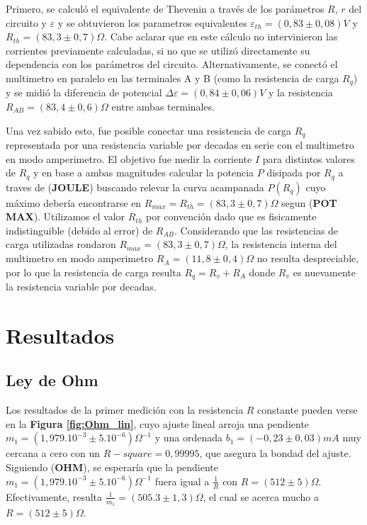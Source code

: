 \documentclass[11pt,a4paper]{article}
\begin{document}
Primero, se calculó el equivalente de Thevenin a través de los parámetros $R$, $r$ del circuito y $\varepsilon$ y se obtuvieron los parametros equivalentes $\varepsilon_{th} = (0,83\pm0,08)V$ y $R_{th} = (83,3 \pm 0,7) \Omega$. Cabe aclarar que en este cálculo no intervinieron las corrientes previamente calculadas, si no que se utilizó directamente su dependencia con los parámetros del circuito. Alternativamente, se conectó el multimetro en paralelo en las terminales A y B (como la resistencia de carga $R_q$) y se midió la diferencia de potencial $\Delta\varepsilon = (0,84 \pm 0,06)V$ y la resistencia $R_{AB} = (83,4\pm0,6)\Omega$ entre ambas terminales. 

Una vez sabido esto, fue posible conectar una resistencia de carga $R_q$ representada por una resistencia variable por decadas en serie con el multimetro en modo amperimetro. El objetivo fue medir la corriente $I$ para distintos valores de $R_q$ y en base a ambas magnitudes calcular la potencia $P$ disipada por $R_q$ a traves de (\textbf{JOULE}) buscando relevar la curva acampanada $P(R_q)$ cuyo máximo debería encontrarse en $R_{max} = R_{th} = (83,3\pm0,7)\Omega$ segun (\textbf{POT MAX}). Utilizamos el valor $R_{th}$ por convención dado que es fisicamente indistinguible (debido al error) de $R_{AB}$. Considerando que las resistencias de carga utilizadas rondaron $R_{max} = (83,3\pm0,7)\Omega$, la resistencia interna del multimetro en modo amperimetro $R_{A} = (11,8 \pm 0,4) \Omega$ no resulta despreciable, por lo que la resistencia de carga resulta $R_q = R_v + R_A$ donde $R_v$ es nuevamente la resistencia variable por decadas. 


\section{Resultados}
\label{sec:discusion}

\subsection{Ley de Ohm}

Los resultados de la primer medición con la resistencia $R$ constante pueden verse en la \textbf{Figura \ref{fig:Ohm_lin}}, cuyo ajuste lineal arroja una pendiente $m_1 = (1,979.10^{-3} \pm 5.10^{-6})\Omega^{-1}$ y una ordenada $b_1 = (-0,23\pm 0,03)mA$ muy cercana a cero con un $R-square = 0,99995$, que asegura la bondad del ajuste. Siguiendo (\textbf{OHM}), se esperaría que la pendiente $m_1 = (1,979.10^{-3} \pm 5.10^{-6})\Omega^{-1}$ fuera igual a $\frac{1}{R}$ con $R = (512 \pm 5)\Omega$. Efectivamente, resulta $\frac{1}{m_1} = (505.3 \pm 1,3)\Omega$, el cual se acerca mucho a $R = (512 \pm 5)\Omega$.
\end{document}
